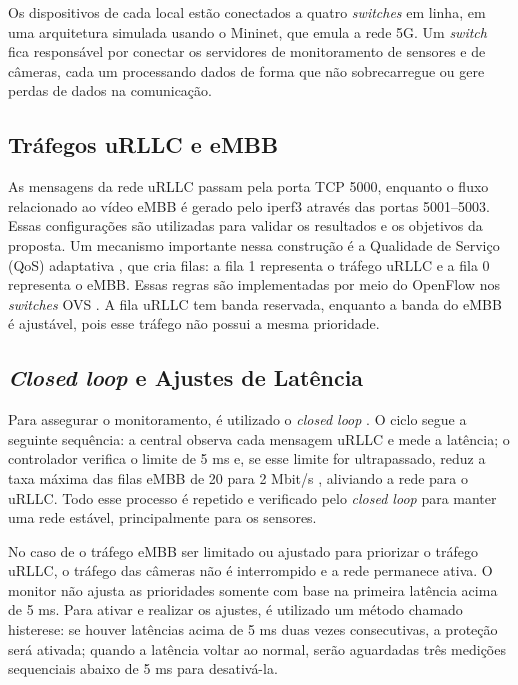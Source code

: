 \documentclass[12pt]{article}
\begin{document}
        Os dispositivos de cada local estão conectados a quatro \textit{switches} em linha, em uma arquitetura simulada usando o Mininet, que emula a rede 5G. Um \textit{switch} fica responsável por conectar os servidores de monitoramento de sensores e de câmeras, cada um processando dados de forma que não sobrecarregue ou gere perdas de dados na comunicação.
        
        \subsection{Tráfegos uRLLC e eMBB}
        
        As mensagens da rede uRLLC passam pela porta TCP 5000, enquanto o fluxo relacionado ao vídeo eMBB é gerado pelo iperf3 através das portas 5001--5003. Essas configurações são utilizadas para validar os resultados e os objetivos da proposta. Um mecanismo importante nessa construção é a Qualidade de Serviço (QoS) adaptativa \cite{olegario2024qos5g}, que cria filas: a fila 1 representa o tráfego uRLLC e a fila 0 representa o eMBB. Essas regras são implementadas por meio do OpenFlow \cite{mckeown2008openflow} nos \textit{switches} OVS \cite{pfaff2015ovs}. A fila uRLLC tem banda reservada, enquanto a banda do eMBB é ajustável, pois esse tráfego não possui a mesma prioridade.

        \subsection{\textit{Closed loop} e Ajustes de Latência}
        
        Para assegurar o monitoramento, é utilizado o \textit{closed loop} \cite{simao2025mecanismo}. O ciclo segue a seguinte sequência: a central observa cada mensagem uRLLC e mede a latência; o controlador verifica o limite de 5 ms e, se esse limite for ultrapassado, reduz a taxa máxima das filas eMBB de 20 para 2 Mbit/s \cite{linuxhtb}, aliviando a rede para o uRLLC. Todo esse processo é repetido e verificado pelo \textit{closed loop} para manter uma rede estável, principalmente para os sensores.

        No caso de o tráfego eMBB ser limitado ou ajustado para priorizar o tráfego uRLLC, o tráfego das câmeras não é interrompido e a rede permanece ativa. O monitor não ajusta as prioridades somente com base na primeira latência acima de 5 ms. Para ativar e realizar os ajustes, é utilizado um método chamado histerese: se houver latências acima de 5 ms duas vezes consecutivas, a proteção será ativada; quando a latência voltar ao normal, serão aguardadas três medições sequenciais abaixo de 5 ms para desativá-la.
        
\end{document}
